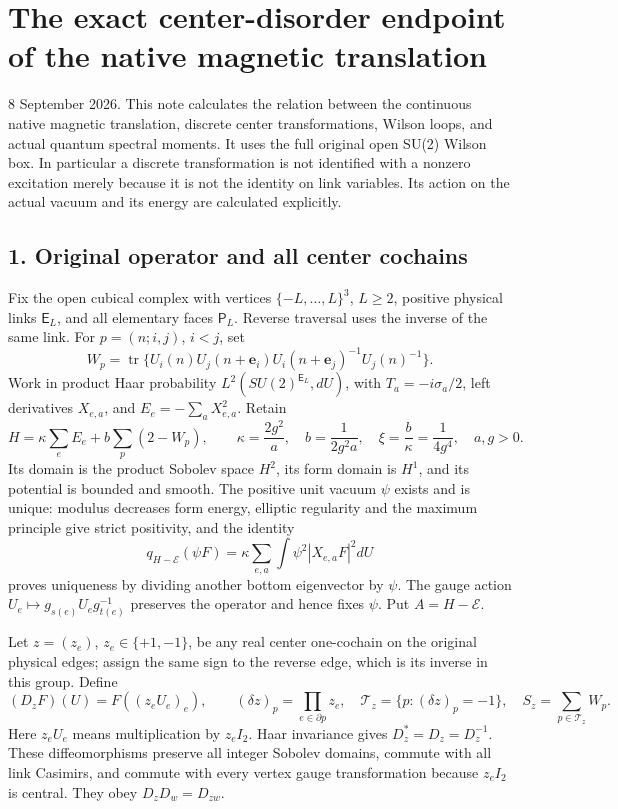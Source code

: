 \documentclass[
  11pt,
]{article}
\begin{document}
\section{The exact center-disorder endpoint of the native magnetic
translation}\label{magnetic-part-7-the-exact-center-disorder-endpoint-of-the-native-magnetic-translation}

8 September 2026. This note calculates the relation between the
continuous native magnetic translation, discrete center transformations,
Wilson loops, and actual quantum spectral moments. It uses the full
original open SU(2) Wilson box. In particular a discrete transformation
is not identified with a nonzero excitation merely because it is not the
identity on link variables. Its action on the actual vacuum and its
energy are calculated explicitly.

\subsection{1. Original operator and all center
cochains}\label{magnetic-part-7-original-operator-and-all-center-cochains}

Fix the open cubical complex with vertices \(\{-L,\ldots,L\}^3\),
\(L\geq2\), positive physical links \(\mathsf E_L\), and all elementary
faces \(\mathsf P_L\). Reverse traversal uses the inverse of the same
link. For \(p=(n;i,j)\), \(i<j\), set \[
 W_p=\operatorname{tr}\{U_i(n)U_j(n+\mathbf e_i)
                  U_i(n+\mathbf e_j)^{-1}U_j(n)^{-1}\}.
\] Work in product Haar probability \(L^2(SU(2)^{\mathsf E_L},dU)\),
with \(T_a=-i\sigma_a/2\), left derivatives \(X_{e,a}\), and
\(E_e=-\sum_aX_{e,a}^2\). Retain \[
 H=\kappa\sum_eE_e+b\sum_p(2-W_p),\qquad
 \kappa=\frac{2g^2}{a},\quad b=\frac1{2g^2a},\quad
 \xi=\frac b\kappa=\frac1{4g^4},\quad a,g>0.
\tag{1}
\] Its domain is the product Sobolev space \(H^2\), its form domain is
\(H^1\), and its potential is bounded and smooth. The positive unit
vacuum \(\psi\) exists and is unique: modulus decreases form energy,
elliptic regularity and the maximum principle give strict positivity,
and the identity \[
 q_{H-\mathcal E}(\psi F)=\kappa\sum_{e,a}\int\psi^2|X_{e,a}F|^2dU
\tag{2}
\] proves uniqueness by dividing another bottom eigenvector by \(\psi\).
The gauge action \(U_e\mapsto g_{s(e)}U_eg_{t(e)}^{-1}\) preserves the
operator and hence fixes \(\psi\). Put \(A=H-\mathcal E\).

Let \(z=(z_e)\), \(z_e\in\{+1,-1\}\), be any real center one-cochain on
the original physical edges; assign the same sign to the reverse edge,
which is its inverse in this group. Define \[
 (D_zF)(U)=F((z_eU_e)_e),\qquad
 (\delta z)_p=\prod_{e\in\partial p}z_e,
 \quad\mathcal T_z=\{p:(\delta z)_p=-1\},
 \quad S_z=\sum_{p\in\mathcal T_z}W_p.
\tag{3}
\] Here \(z_eU_e\) means multiplication by \(z_e I_2\). Haar invariance
gives \(D_z^*=D_z=D_z^{-1}\). These diffeomorphisms preserve all integer
Sobolev domains, commute with all link Casimirs, and commute with every
vertex gauge transformation because \(z_eI_2\) is central. They obey
\(D_zD_w=D_{zw}\).
\end{document}
